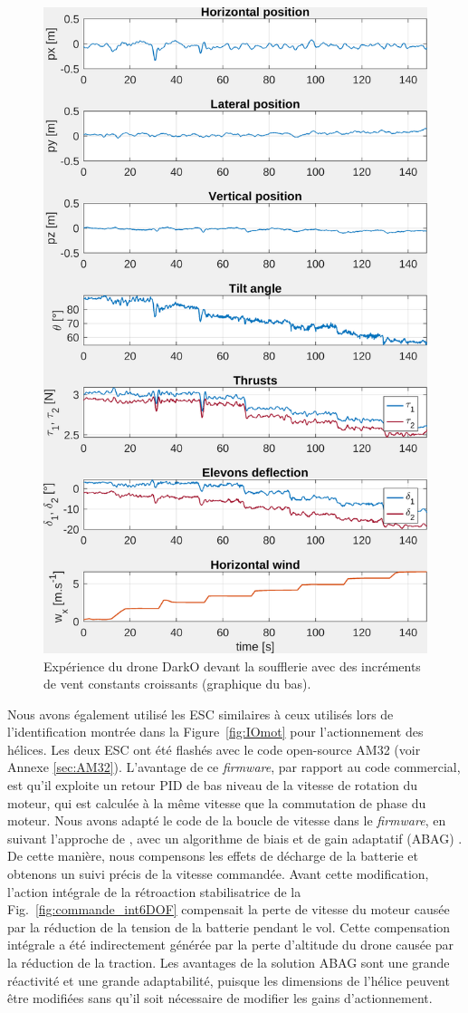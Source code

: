 \begin{figure}[ht!]
    \centering
    \includegraphics[trim=0cm 0cm 0cm 0cm,clip,width=0.6\columnwidth]{figures/exp_systune_struct.png}
    \caption{Expérience du drone DarkO devant la soufflerie avec des incréments de vent constants croissants (graphique du bas).}
    \label{fig:ExpSytuneStruct}
\end{figure}

Nous avons également utilisé les ESC similaires à ceux utilisés lors de l'identification montrée dans la Figure~\ref{fig:IOmot} pour l'actionnement des hélices. Les deux ESC ont été flashés avec le code open-source AM32 (voir Annexe \ref{sec:AM32}). L'avantage de ce \textit{firmware}, par rapport au code commercial, est qu'il exploite un retour PID  de bas niveau de la vitesse de rotation du moteur, qui est calculée à la même vitesse que la commutation de phase du moteur. Nous avons adapté le code de la boucle de vitesse dans le \textit{firmware}, en suivant l'approche de \cite{franchi2017}, avec un algorithme de biais et de gain adaptatif (ABAG) . De cette manière, nous compensons les effets de décharge de la batterie et obtenons un suivi précis de la vitesse commandée. Avant cette modification, l'action intégrale de la rétroaction stabilisatrice de la Fig.~\ref{fig:commande_int6DOF} compensait la perte de vitesse du moteur causée par la réduction de la tension de la batterie pendant le vol. Cette compensation intégrale a été indirectement générée par la perte d'altitude du drone causée par la réduction de la traction. Les avantages de la solution ABAG sont une grande réactivité et une grande adaptabilité, puisque les dimensions de l'hélice peuvent être modifiées sans qu'il soit nécessaire de modifier les gains d'actionnement.

